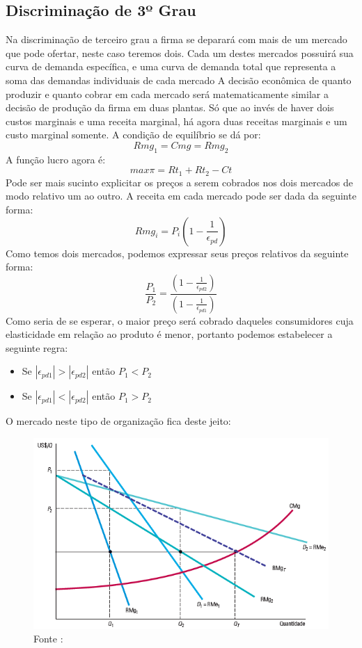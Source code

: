 \documentclass[12pt,a4paper,oneside,brazil]{abntex2}
\begin{document}
\subsection{Discriminação de 3º Grau}
Na discriminação de terceiro grau a firma se deparará com mais de um mercado que pode ofertar, neste caso teremos dois. Cada um destes mercados possuirá sua curva de demanda específica, e uma curva de demanda total que representa a soma das demandas individuais de cada mercado A decisão econômica de quanto produzir e quanto cobrar em cada mercado será matematicamente similar a decisão de produção da firma em duas plantas. Só que ao invés de haver dois custos marginais e uma receita marginal, há agora duas receitas marginais e um custo marginal somente. A condição de equilíbrio se dá por:
\[ Rmg_1 = Cmg = Rmg_2 \]
A função lucro agora é:
\[ max \pi = Rt_1 + Rt_2 - Ct \]
Pode ser mais sucinto explicitar os preços a serem cobrados nos dois mercados de modo relativo um ao outro. A receita em cada mercado pode ser dada da seguinte forma:
\[ Rmg_i = P_i (1- \frac{1}{\epsilon_{pd}}) \]
Como temos dois mercados, podemos expressar seus preços relativos da seguinte forma:
\[ \frac{P_1}{P_2} = \frac{(1-\frac{1}{\epsilon_{pd2}})}{(1- \frac{1}{\epsilon_{pd1}})} \]
Como seria de se esperar, o maior preço será cobrado daqueles consumidores cuja elasticidade em relação ao produto é menor, portanto podemos estabelecer a seguinte regra:
\begin{itemize}
\item Se $ |\epsilon_{pd1}| > |\epsilon_{pd2}|$ então $ P_1 < P_2$
\item Se $ |\epsilon_{pd1}| < |\epsilon_{pd2}|$ então $ P_1 > P_2$
\end{itemize}
O mercado neste tipo de organização fica deste jeito:
\begin{figure}[h]
\includegraphics[scale=0.7]{Discriminação terceiro grau.png}
\centering
\caption{Fonte : \cite[p. 402]{pindyck}}
\end{figure}
\end{document}
